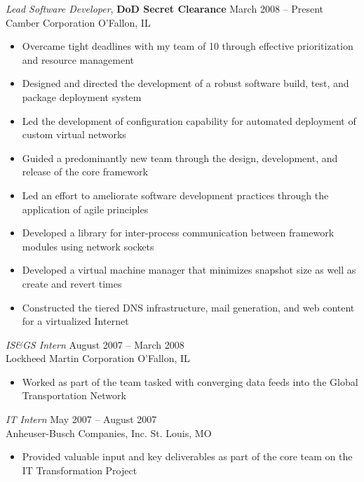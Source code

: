 \documentclass[margin,line]{resume}
\begin{document}
\begin{resume}
{\sl Lead Software Developer}, \textbf{\small DoD Secret Clearance}   \hfill  March 2008 -- Present\\
Camber Corporation                                                    \hfill  O'Fallon, IL
\begin{itemize} \itemsep -2pt %
\small\item Overcame tight deadlines with my team of 10 through effective prioritization and resource management
\small\item Designed and directed the development of a robust software build, test, and package deployment system
\small\item Led the development of configuration capability for automated deployment of custom virtual networks
\small\item Guided a predominantly new team through the design, development, and release of the core framework
\small\item Led an effort to ameliorate software development practices through the application of agile principles
\small\item Developed a library for inter-process communication between framework modules using network sockets
\small\item Developed a virtual machine manager that minimizes snapshot size as well as create and revert times
\small\item Constructed the tiered DNS infrastructure, mail generation, and web content for a virtualized Internet
\end{itemize}

{\sl IS\&GS Intern}                 \hfill  August 2007 -- March 2008\\
Lockheed Martin Corporation         \hfill  O'Fallon, IL
\begin{itemize} \itemsep -2pt %
\small\item Worked as part of the team tasked with converging data feeds into the Global Transportation Network
\end{itemize}

{\sl IT Intern}                     \hfill  May 2007 -- August 2007\\
Anheuser-Busch Companies, Inc.      \hfill  St. Louis, MO
\begin{itemize} \itemsep -2pt %
\small\item Provided valuable input and key deliverables as part of the core team on the IT Transformation Project
\end{itemize}


\end{resume}
\end{document}
